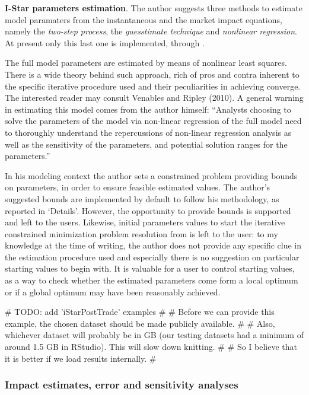 \textbf{I-Star parameters estimation}. The author suggests three methods
to estimate model paramaters from the instantaneous and the market
impact equations, namely the \emph{two-step process}, the
\emph{guesstimate technique} and \emph{nonlinear regression}. At present
only this last one is implemented, through .

The full model parameters are estimated by means of nonlinear least
squares. There is a wide theory behind such approach, rich of pros and
contra inherent to the specific iterative procedure used and their
peculiarities in achieving converge. The interested reader may consult
Venables and Ripley (2010). A general warning in estimating this model
comes from the author himself: ``Analysts choosing to solve the
parameters of the model via non-linear regression of the full model need
to thoroughly understand the repercussions of non-linear regression
analysis as well as the sensitivity of the parameters, and potential
solution ranges for the parameters.''

In his modeling context the author sets a constrained problem providing
bounds on parameters, in order to ensure feasible estimated values. The
author's suggested bounds are implemented by default to follow his
methodology, as reported in `Details'. However, the opportunity to
provide bounds is supported and left to the users. Likewise, initial
parameters values to start the iterative constrained minimization
problem resolution from is left to the user: to my knowledge at the time
of writing, the author does not provide any specific clue in the
estimation procedure used and especially there is no suggestion on
particular starting values to begin with. It is valuable for a user to
control starting values, as a way to check whether the estimated
parameters come form a local optimum or if a global optimum may have
been reasonably achieved.

\begin{Schunk}
\begin{Sinput}
# TODO: add 'iStarPostTrade' examples
# 
# Before we can provide this example, the chosen dataset should be made publicly available.
# 
# Also, whichever dataset will probably be in GB (our testing datasets had a minimum of around 1.5 GB in RStudio). This will slow down knitting.
# 
# So I believe that it is better if we load results internally.
#  
\end{Sinput}
\end{Schunk}

\hypertarget{impact-estimates-error-and-sensitivity-analyses}{%
\subsubsection{Impact estimates, error and sensitivity
analyses}\label{impact-estimates-error-and-sensitivity-analyses}}

